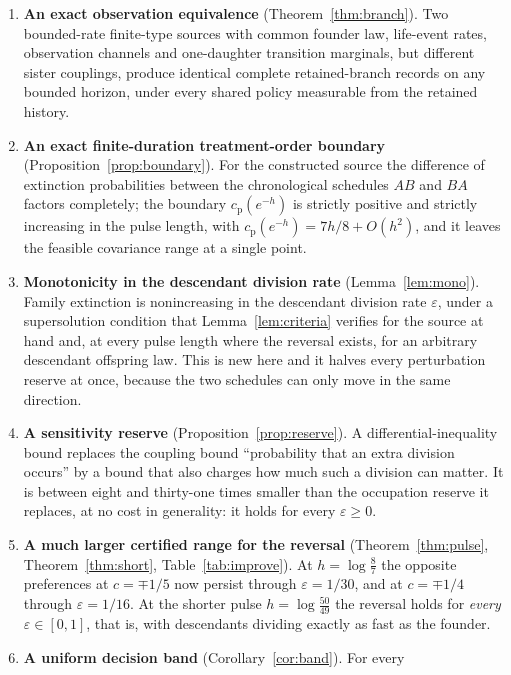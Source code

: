 \documentclass[11pt]{article}
\theoremstyle{plain}
\theoremstyle{definition}
\theoremstyle{remark}
\newcommand{\eps}{\varepsilon}
\newcommand{\cp}{c_{\mathrm p}}
\begin{document}
\begin{enumerate}[nosep,leftmargin=*]
\item \textbf{An exact observation equivalence} (Theorem~\ref{thm:branch}).
      Two bounded-rate finite-type sources with common founder law, life-event
      rates, observation channels and one-daughter transition marginals, but
      different sister couplings, produce identical complete retained-branch
      records on any bounded horizon, under every shared policy measurable from
      the retained history.
\item \textbf{An exact finite-duration treatment-order boundary}
      (Proposition~\ref{prop:boundary}). For the constructed source the
      difference of extinction probabilities between the chronological
      schedules $AB$ and $BA$ factors completely; the boundary
      $\cp(e^{-h})$ is strictly positive and strictly increasing in the pulse
      length, with $\cp(e^{-h})=7h/8+O(h^2)$, and it leaves the feasible
      covariance range at a single point.
\item \textbf{Monotonicity in the descendant division rate}
      (Lemma~\ref{lem:mono}). Family extinction is nonincreasing in the
      descendant division rate $\eps$, under a supersolution condition that
      Lemma~\ref{lem:criteria} verifies for the source at hand and, at every
      pulse length where the reversal exists, for an arbitrary descendant
      offspring law. This is new here and it halves every perturbation reserve
      at once, because the two schedules can only move in the same direction.
\item \textbf{A sensitivity reserve} (Proposition~\ref{prop:reserve}). A
      differential-inequality bound replaces the coupling bound ``probability
      that an extra division occurs'' by a bound that also charges how much
      such a division can matter. It is between eight and thirty-one times
      smaller than the occupation reserve it replaces, at no cost in
      generality: it holds for every $\eps\ge0$.
\item \textbf{A much larger certified range for the reversal}
      (Theorem~\ref{thm:pulse}, Theorem~\ref{thm:short},
      Table~\ref{tab:improve}). At $h=\log\frac87$ the opposite preferences at
      $c=\mp1/5$ now persist through $\eps=1/30$, and at $c=\mp1/4$ through
      $\eps=1/16$. At the shorter pulse $h=\log\frac{50}{49}$ the reversal
      holds for \emph{every} $\eps\in[0,1]$, that is, with descendants dividing
      exactly as fast as the founder.
\item \textbf{A uniform decision band} (Corollary~\ref{cor:band}). For every

\end{enumerate}
\end{document}
